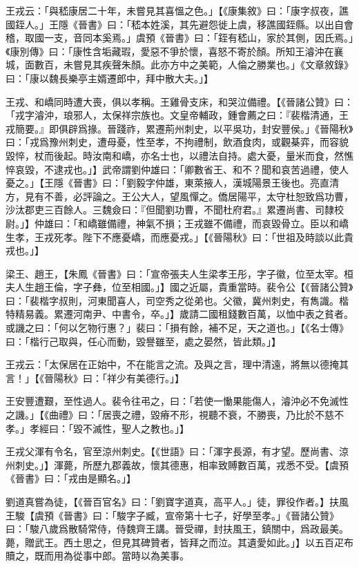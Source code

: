 王戎云：「與嵇康居二十年，未嘗見其喜慍之色。」【《康集敘》曰：「康字叔夜，譙國銍人。」王隱《晉書》曰：「嵇本姓溪，其先避怨徙上虞，移譙國銍縣。以出自會稽，取國⼀支，音同本奚焉。」虞預《晉書》曰：「銍有嵇山，家於其側，因氏焉。」《康別傳》曰：「康性含垢藏瑕，愛惡不爭於懷，喜怒不寄於顏。所知王濬沖在襄城，面數百，未嘗見其疾聲朱顏。此亦方中之美範，人倫之勝業也。」《文章敘錄》曰：「康以魏長樂亭主婿遷郎中，拜中散大夫。」】

王戎、和嶠同時遭大喪，俱以孝稱。王雞骨支床，和哭泣備禮。【《晉諸公贊》曰：「戎字濬沖，琅邪人，太保祥宗族也。文皇帝輔政，鍾會薦之曰：『裴楷清通，王戎簡要。』即俱辟爲掾。晉踐祚，累遷荊州刺史，以平吳功，封安豐侯。」《晉陽秋》曰：「戎爲豫州刺史，遭母憂，性至孝，不拘禮制，飲酒食肉，或觀棊弈，而容貌毀悴，杖而後起。時汝南和嶠，亦名士也，以禮法自持。處大憂，量米而食，然憔悴哀毀，不逮戎也。」】武帝謂劉仲雄曰：「卿數省王、和不？聞和哀苦過禮，使人憂之。」【王隱《晉書》曰：「劉毅字仲雄，東萊掖人，漢城陽景王後也。亮直清方，見有不善，必評論之。王公大人，望風憚之。僑居陽平，太守杜恕致爲功曹，沙汰郡吏三百餘人。三魏僉曰：『但聞劉功曹，不聞杜府君。』累遷尚書、司隸校尉。」】仲雄曰：「和嶠雖備禮，神氣不損；王戎雖不備禮，而哀毀骨立。臣以和嶠生孝，王戎死孝。陛下不應憂嶠，而應憂戎。」【《晉陽秋》曰：「世祖及時談以此貴戎也。」】

梁王、趙王，【朱鳳《晉書》曰：「宣帝張夫人生梁孝王彤，字子徽，位至太宰。桓夫人生趙王倫，字子彝，位至相國。」】國之近屬，貴重當時。裴令公【《晉諸公贊》曰：「裴楷字叔則，河東聞喜人，司空秀之從弟也。父徽，冀州刺史，有雋識。楷特精易義。累遷河南尹、中書令，卒。」】歲請二國租錢數百萬，以恤中表之貧者。或譏之曰：「何以乞物行惠？」裴曰：「損有餘，補不足，天之道也。」【《名士傳》曰：「楷行己取與，任心而動，毀譽雖至，處之晏然，皆此類。」】

王戎云：「太保居在正始中，不在能言之流。及與之言，理中清遠，將無以德掩其言！」【《晉陽秋》曰：「祥少有美德行。」】

王安豐遭艱，至性過人。裴令往弔之，曰：「若使一慟果能傷人，濬沖必不免滅性之譏。」【《曲禮》曰：「居喪之禮，毀瘠不形，視聽不衰，不勝喪，乃比於不慈不孝。」孝經曰：「毀不滅性，聖人之教也。」】

王戎父渾有令名，官至涼州刺史。【《世語》曰：「渾字長源，有才望。歷尚書、涼州刺史。」】渾薨，所歷九郡義故，懷其德惠，相率致賻數百萬，戎悉不受。【虞預《晉書》曰：「戎由是顯名。」】

劉道真嘗為徒，【《晉百官名》曰：「劉寶字道真，高平人。」徒，罪役作者。】扶風王駿【虞預《晉書》曰：「駿字子臧，宣帝第十七子，好學至孝。」《晉諸公贊》曰：「駿八歲爲散騎常侍，侍魏齊王講。晉受禪，封扶風王，鎮關中，爲政最美。薨，贈武王。西土思之，但見其碑贊者，皆拜之而泣。其遺愛如此。」】以五百疋布贖之，既而用為從事中郎。當時以為美事。

